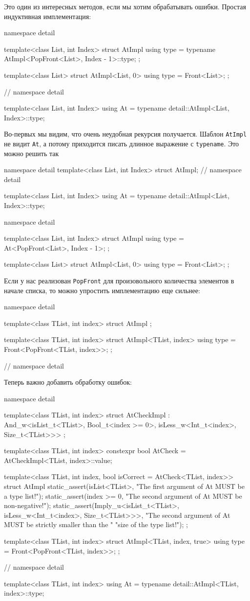Это один из интересных методов, если мы хотим обрабатывать ошибки.
Простая индуктивная имплементация:
\begin{cppcode}
namespace detail {
template<class List, int Index>
struct AtImpl {
  using type = typename AtImpl<PopFront<List>, Index - 1>::type;
};

template<class List>
struct AtImpl<List, 0> {
  using type = Front<List>;
};
} // namespace detail

template<class List, int Index>
using At = typename detail::AtImpl<List, Index>::type;
\end{cppcode}
Во-первых мы видим, что очень неудобная рекурсия получается.
Шаблон \verb"AtImpl" не видит \verb"At", а потому приходится писать длинное выражение с \verb"typename".
Это можно решить так
\begin{cppcode}
namespace detail {
template<class List, int Index>
struct AtImpl;
} // namespace detail

template<class List, int Index>
using At = typename detail::AtImpl<List, Index>::type;

namespace detail {
template<class List, int Index>
struct AtImpl {
  using type = At<PopFront<List>, Index - 1>;
};

template<class List>
struct AtImpl<List, 0> {
  using type = Front<List>;
};
}
\end{cppcode}
Если у нас реализован \verb"PopFront" для произовольного количества элементов в начале списка, то можно упростить имплементацию еще сильнее:
\begin{cppcode}
namespace detail {
template<class TList, int index>
struct AtImpl { };

template<class TList, int index>
struct AtImpl<TList, index> {
  using type = Front<PopFront<TList, index>>;
};
} // namespace detail
\end{cppcode}
Теперь важно добавить обработку ошибок:
\begin{cppcode}
namespace detail {
template<class TList, int index>
struct AtCheckImpl : And_w<isList_t<TList>, Bool_t<index >= 0>,
                           isLess_w<Int_t<index>, Size_t<TList>>> {};

template<class TList, int index>
constexpr bool AtCheck = AtCheckImpl<TList, index>::value;

template<class TList, int index, bool isCorrect = AtCheck<TList, index>>
struct AtImpl {
  static_assert(isList<TList>, "The first argument of At MUST be a type list!");
  static_assert(index >= 0, "The second argument of At MUST be non-negative!");
  static_assert(Imply_u<isList_t<TList>, isLess_w<Int_t<index>, Size_t<TList>>>,
                "The second argument of At MUST be strictly smaller than the "
                "size of the type list!");
};

template<class TList, int index>
struct AtImpl<TList, index, true> {
  using type = Front<PopFront<TList, index>>;
};
} // namespace detail

template<class TList, int index>
using At = typename detail::AtImpl<TList, index>::type;
\end{cppcode}
